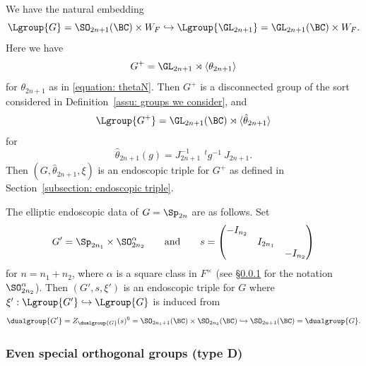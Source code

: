 \documentclass[11pt,letterpaper]{amsart}
\numberwithin{equation}{section}
\begin{document}
We have the natural embedding
\[
\Lgroup{G} =\SO_{2n+1}(\BC) \times W_F 
\hookrightarrow 
\Lgroup{\GL_{2n+1}} =
\GL_{2n+1}(\BC) \times W_F.
\]
Here we have 
\[
G^+= \GL_{2n+1}\rtimes \langle\theta_{2n+1}\rangle
\]
for $\theta_{2n+1}$ as in \eqref{equation: thetaN}.
Then $G^+$ is a disconnected group of the sort considered in Definition~\ref{assu: groups we consider}, and 
\[
\Lgroup{G^+} = \GL_{2n+1}(\BC)\rtimes{\langle{\hat{\theta}_{2n+1}}\rangle}
\]
for
\begin{equation}\label{equation: theta C}
{\hat\theta}_{2n+1}(g) 
=
J_{2n+1}^{-1}\ \,^tg^{-1}\ J_{2n+1}.
\end{equation}
Then $(G,{\hat\theta}_{2n+1},\xi)$ is an endoscopic triple for $G^+$ as defined in Section~\ref{subsection: endoscopic triple}.

The elliptic endoscopic data of $G=\Sp_{2n}$ are as follows. 
Set
\begin{equation}\label{equation: s C}
G' = \Sp_{2n_1} \times \SO_{2n_2}^{\alpha}
\qquad\text{and}\qquad
s=\begin{pmatrix}
-I_{n_2}&&\\
&I_{2{n_1}}&\\
&&-I_{n_2}
\end{pmatrix}
\end{equation}
for $n=n_1+n_2$, where $\alpha$ is a square class in $F^\times$ (see \S\ref{subsubsection: D} for the notation $\SO_{2n_2}^\alpha$). 
Then $(G',s,\xi')$ is an endoscopic triple for $G$ where $\xi': \Lgroup{G'} \hookrightarrow \Lgroup{G}$ is induced from
\[
\dualgroup{G'} 
=
Z_{\dualgroup{G}}(s)^0
=
\SO_{2n_1+1}(\BC) \times \SO_{2n_2}(\BC)
\hookrightarrow
\SO_{2n+1}(\BC)
=
\dualgroup{G}.
\] 


\subsubsection{Even special orthogonal groups (type D)}\label{subsubsection: D}
\end{document}
